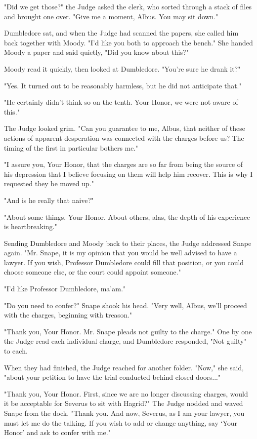 \documentclass[a4paper,11pt]{article}
\begin{document}
"Did we get those?" the Judge asked the clerk, who sorted through a stack of files and brought one over. "Give me a moment, Albus. You may sit down."

Dumbledore sat, and when the Judge had scanned the papers, she called him back together with Moody. "I'd like you both to approach the bench." She handed Moody a paper and said quietly, "Did you know about this?"

Moody read it quickly, then looked at Dumbledore. "You're sure he drank it?"

"Yes. It turned out to be reasonably harmless, but he did not anticipate that."

"He certainly didn't think so on the tenth. Your Honor, we were not aware of this."

The Judge looked grim. "Can you guarantee to me, Albus, that neither of these actions of apparent desperation was connected with the charges before us? The timing of the first in particular bothers me."

"I assure you, Your Honor, that the charges are so far from being the source of his depression that I believe focusing on them will help him recover. This is why I requested they be moved up."

"And is he really that naive?"

"About some things, Your Honor. About others, alas, the depth of his experience is heartbreaking."

Sending Dumbledore and Moody back to their places, the Judge addressed Snape again. "Mr. Snape, it is my opinion that you would be well advised to have a lawyer. If you wish, Professor Dumbledore could fill that position, or you could choose someone else, or the court could appoint someone."

"I'd like Professor Dumbledore, ma'am."

"Do you need to confer?" Snape shook his head. "Very well, Albus, we'll proceed with the charges, beginning with treason."

"Thank you, Your Honor. Mr. Snape pleads not guilty to the charge." One by one the Judge read each individual charge, and Dumbledore responded, "Not guilty" to each.

When they had finished, the Judge reached for another folder. "Now," she said, "about your petition to have the trial conducted behind closed doors..."

"Thank you, Your Honor. First, since we are no longer discussing charges, would it be acceptable for Severus to sit with Hagrid?" The Judge nodded and waved Snape from the dock. "Thank you. And now, Severus, as I am your lawyer, you must let me do the talking. If you wish to add or change anything, say `Your Honor' and ask to confer with me."
\end{document}
